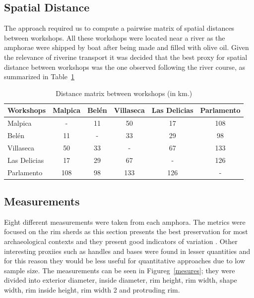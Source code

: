 \documentclass[review]{elsarticle}
\begin{document}
\subsection{Spatial Distance}

The approach required us to compute a pairwise matrix of spatial distances between workshops. All these workshops were located near a river as the amphorae were shipped by boat after being made and filled with olive oil. Given the relevance of riverine transport it was decided that the best proxy for spatial distance between workshops was the one observed following the river course, as summarized in Table~\ref{table:distances}

\begin{table}[htp]
\centering

\begin{tabular}{lccccc}
\hline

\textbf{Workshops} & Malpica & Belén & Villaseca & Las Delicias & Parlamento \\ \hline
Malpica & - & 11 & 50 & 17 & 108 \\
Belén & 11 & - & 33 & 29 & 98 \\
Villaseca & 50 & 33 & - & 67 & 133 \\
Las Delicias & 17 & 29 & 67 & - & 126 \\
Parlamento & 108 & 98 & 133 & 126 & - \\
\hline
\end{tabular}
\caption{Distance matrix between workshops (in km.)}
\label{table:distances}
\end{table}

\subsection{Measurements}

Eight different measurements were taken from each amphora. The metrics were focused on the rim sherds as this section presents the best preservation for most archaeological contexts and they present good indicators of variation \citep{berni_millet_epigrafianforica_2008}. Other interesting proxiies such as handles and bases were found in lesser quantities and for this reason they would be less useful for quantitative approaches due to low sample size. The measurements can be seen in Figureg~\ref{mesures}; they were divided into exterior diameter, inside diameter, rim height, rim width, shape width, rim inside height, rim width 2 and protruding rim.
\end{document}
